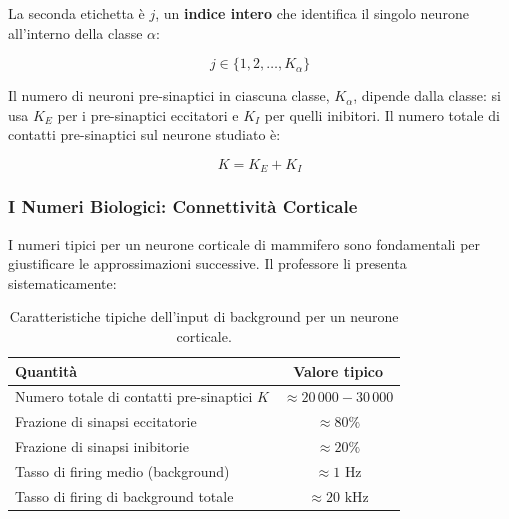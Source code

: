 La seconda etichetta è $j$, un \textbf{indice intero} che identifica il singolo neurone all'interno della classe $\alpha$:

\begin{equation}
j \in \{1, 2, \ldots, K_\alpha\}
\end{equation}

Il numero di neuroni pre-sinaptici in ciascuna classe, $K_\alpha$, dipende dalla classe: si usa $K_E$ per i pre-sinaptici eccitatori e $K_I$ per quelli inibitori. Il numero totale di contatti pre-sinaptici sul neurone studiato è:

\begin{equation}
K = K_E + K_I
\end{equation}

\subsubsection{I Numeri Biologici: Connettività Corticale}

I numeri tipici per un neurone corticale di mammifero sono fondamentali per giustificare le approssimazioni successive. Il professore li presenta sistematicamente:


\begin{table}[htbp]
    \centering
    \renewcommand{\arraystretch}{1.3}
    \begin{tabular}{|l|c|}
    \hline
    \textbf{Quantità} & \textbf{Valore tipico} \\
    \hline
    Numero totale di contatti pre-sinaptici $K$ & $\approx 20\,000 - 30\,000$ \\
    \hline
    Frazione di sinapsi eccitatorie & $\approx 80\%$  \\
    \hline
    Frazione di sinapsi inibitorie & $\approx 20\%$  \\
    \hline
    Tasso di firing medio (background) & $\approx 1\text{ Hz}$ \\
    \hline
    Tasso di firing di background totale & $\approx 20\text{ kHz}$ \\
    \hline
    \end{tabular}
    \caption{Caratteristiche tipiche dell'input di background per un neurone corticale.}
    \label{tab:neurone_background}
\end{table}

